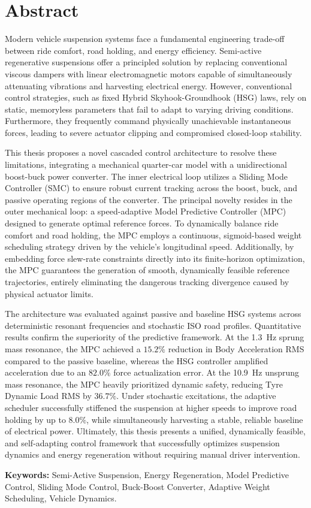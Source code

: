 \chapter*{Abstract}
\label{chap:abstract}
Modern vehicle suspension systems face a fundamental engineering trade-off between ride comfort, road holding, and energy efficiency. Semi-active regenerative suspensions offer a principled solution by replacing conventional viscous dampers with linear electromagnetic motors capable of simultaneously attenuating vibrations and harvesting electrical energy. However, conventional control strategies, such as fixed Hybrid Skyhook-Groundhook (HSG) laws, rely on static, memoryless parameters that fail to adapt to varying driving conditions. Furthermore, they frequently command physically unachievable instantaneous forces, leading to severe actuator clipping and compromised closed-loop stability. 

This thesis proposes a novel cascaded control architecture to resolve these limitations, integrating a mechanical quarter-car model with a unidirectional boost-buck power converter. The inner electrical loop utilizes a Sliding Mode Controller (SMC) to ensure robust current tracking across the boost, buck, and passive operating regions of the converter. The principal novelty resides in the outer mechanical loop: a speed-adaptive Model Predictive Controller (MPC) designed to generate optimal reference forces. To dynamically balance ride comfort and road holding, the MPC employs a continuous, sigmoid-based weight scheduling strategy driven by the vehicle's longitudinal speed. Additionally, by embedding force slew-rate constraints directly into its finite-horizon optimization, the MPC guarantees the generation of smooth, dynamically feasible reference trajectories, entirely eliminating the dangerous tracking divergence caused by physical actuator limits.

The architecture was evaluated against passive and baseline HSG systems across deterministic resonant frequencies and stochastic ISO road profiles. Quantitative results confirm the superiority of the predictive framework. At the \SI{1.3}{\hertz} sprung mass resonance, the MPC achieved a $15.2\%$ reduction in Body Acceleration RMS compared to the passive baseline, whereas the HSG controller amplified acceleration due to an $82.0\%$ force actualization error. At the \SI{10.9}{\hertz} unsprung mass resonance, the MPC heavily prioritized dynamic safety, reducing Tyre Dynamic Load RMS by $36.7\%$. Under stochastic excitations, the adaptive scheduler successfully stiffened the suspension at higher speeds to improve road holding by up to $8.0\%$, while simultaneously harvesting a stable, reliable baseline of electrical power. Ultimately, this thesis presents a unified, dynamically feasible, and self-adapting control framework that successfully optimizes suspension dynamics and energy regeneration without requiring manual driver intervention.

\vspace{1cm}
\noindent\textbf{Keywords:} Semi-Active Suspension, Energy Regeneration, Model Predictive Control, Sliding Mode Control, Buck-Boost Converter, Adaptive Weight Scheduling, Vehicle Dynamics.


